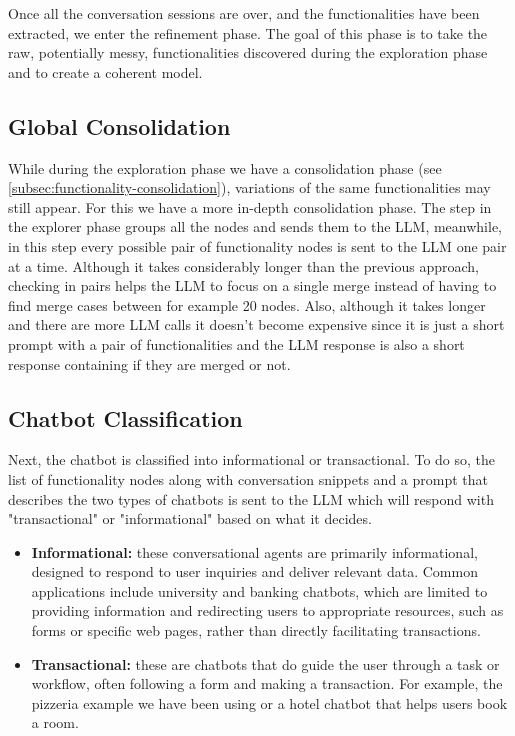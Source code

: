 Once all the conversation sessions are over,
and the functionalities have been extracted,
we enter the refinement phase.
The goal of this phase is to take the raw, potentially messy,
functionalities discovered during the exploration phase
and to create a coherent model.

\subsection{Global Consolidation}

While during the exploration phase we have a consolidation phase
(see \autoref{subsec:functionality-consolidation}),
variations of the same functionalities may still appear.
For this we have a more in-depth consolidation phase.
The step in the explorer phase groups all the nodes
and sends them to the \ac{LLM},
meanwhile, in this step every possible pair of functionality nodes
is sent to the \ac{LLM} one pair at a time.
Although it takes considerably longer than the previous approach,
checking in pairs helps the \ac{LLM} to focus on a single merge
instead of having to find merge cases between for example 20 nodes.
Also, although it takes longer and there are more \ac{LLM} calls
it doesn't become expensive since it is just a short prompt
with a pair of functionalities
and the \ac{LLM} response is also a short response
containing if they are merged or not.

\subsection{Chatbot Classification}

Next, the chatbot is classified into informational or transactional.
To do so, the list of functionality nodes along with conversation snippets
and a prompt that describes the two types of chatbots
is sent to the \ac{LLM} which will respond with
"transactional" or "informational" based on what it decides.

\begin{itemize}
  \item \textbf{Informational:}
    these conversational agents are primarily informational,
    designed to respond to user inquiries and deliver relevant data.
    Common applications include university and banking chatbots,
    which are limited to providing information and
    redirecting users to appropriate resources,
    such as forms or specific web pages,
    rather than directly facilitating transactions.

  \item \textbf{Transactional:}
    these are chatbots that do guide the user
    through a task or workflow,
    often following a form and making a transaction.
    For example, the pizzeria example we have been using
    or a hotel chatbot that helps users book a room.
\end{itemize}

